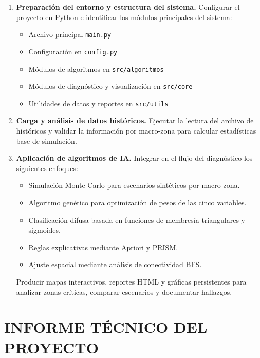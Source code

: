 \documentclass[11pt]{article}
\begin{document}
\begin{enumerate}[leftmargin=*, itemsep=0.2em, topsep=0.2em]
    \item \textbf{Preparación del entorno y estructura del sistema.}
    Configurar el proyecto en Python e identificar los módulos principales del sistema:
    \begin{itemize}[leftmargin=1.5em, itemsep=0pt, topsep=0pt]
        \item Archivo principal \texttt{main.py}
        \item Configuración en \texttt{config.py}
        \item Módulos de algoritmos en \texttt{src/algoritmos}
        \item Módulos de diagnóstico y visualización en \texttt{src/core}
        \item Utilidades de datos y reportes en \texttt{src/utils}
    \end{itemize}

    \item \textbf{Carga y análisis de datos históricos.}
    Ejecutar la lectura del archivo de históricos y validar la información por macro-zona para calcular estadísticas base de simulación.

    \item \textbf{Aplicación de algoritmos de IA.}
    Integrar en el flujo del diagnóstico los siguientes enfoques:
    \begin{itemize}[leftmargin=1.5em, itemsep=0pt, topsep=0pt]
        \item Simulación Monte Carlo para escenarios sintéticos por macro-zona.
        \item Algoritmo genético para optimización de pesos de las cinco variables.
        \item Clasificación difusa basada en funciones de membresía triangulares y sigmoides.
        \item Reglas explicativas mediante Apriori y PRISM.
        \item Ajuste espacial mediante análisis de conectividad BFS.
    \end{itemize}
    Producir mapas interactivos, reportes HTML y gráficas persistentes para analizar zonas críticas, comparar escenarios y documentar hallazgos.
\end{enumerate}

\section{INFORME TÉCNICO DEL PROYECTO}
\end{document}
